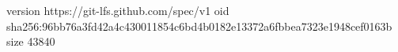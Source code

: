 version https://git-lfs.github.com/spec/v1
oid sha256:96bb76a3fd42a4c430011854c6bd4b0182e13372a6fbbea7323e1948cef0163b
size 43840
